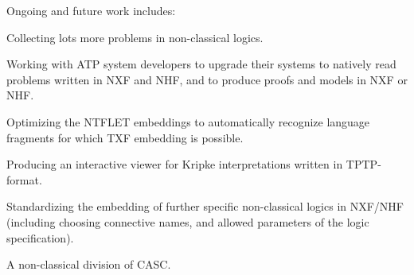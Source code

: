 \documentclass{ceurart}
\newenvironment{packed_itemize}{
\vspace*{-0.5em}
\begin{itemize}
\setlength{\partopsep}{0pt}
\setlength{\itemsep}{1pt}
\setlength{\parskip}{0pt}
\setlength{\parsep}{0pt}
}{\end{itemize}}
\begin{document}
Ongoing and future work includes:
\begin{packed_itemize}
\item Collecting lots more problems in non-classical logics.
\item Working with ATP system developers to upgrade their systems to natively read problems 
      written in NXF and NHF, and to produce proofs and models in NXF or NHF.
\item Optimizing the NTFLET embeddings to automatically recognize language fragments for which
      TXF embedding is possible.
\item Producing an interactive viewer for Kripke interpretations written in TPTP-format.
\item Standardizing the embedding of further specific non-classical logics in NXF/NHF (including
      choosing connective names, and allowed parameters of the logic specification).
\item A non-classical division of CASC.
\end{packed_itemize}

% 

\end{document}
